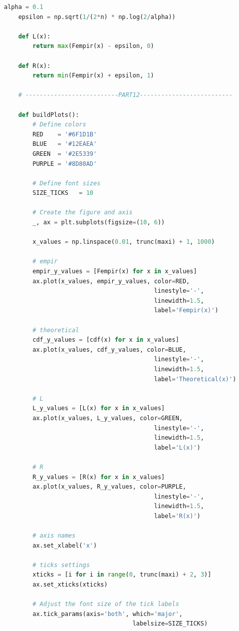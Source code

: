 \documentclass[a4paper, 14pt]{extarticle}
\begin{document}
\begin{center}
\begin{lstlisting}[language=Python]
    alpha = 0.1
    epsilon = np.sqrt(1/(2*n) * np.log(2/alpha))

    def L(x):
        return max(Fempir(x) - epsilon, 0)
    
    def R(x):
        return min(Fempir(x) + epsilon, 1)
    
    # --------------------------PART12--------------------------

    def buildPlots():
        # Define colors
        RED    = '#6F1D1B'
        BLUE   = '#12EAEA'
        GREEN  = '#2E5339'
        PURPLE = '#8D80AD'

        # Define font sizes
        SIZE_TICKS   = 10

        # Create the figure and axis
        _, ax = plt.subplots(figsize=(10, 6))

        x_values = np.linspace(0.01, trunc(maxi) + 1, 1000)

        # empir
        empir_y_values = [Fempir(x) for x in x_values]
        ax.plot(x_values, empir_y_values, color=RED, 
                                          linestyle='-', 
                                          linewidth=1.5, 
                                          label='Fempir(x)')

        # theoretical
        cdf_y_values = [cdf(x) for x in x_values]
        ax.plot(x_values, cdf_y_values, color=BLUE, 
                                          linestyle='-', 
                                          linewidth=1.5, 
                                          label='Theoretical(x)')

        # L
        L_y_values = [L(x) for x in x_values]
        ax.plot(x_values, L_y_values, color=GREEN, 
                                          linestyle='-', 
                                          linewidth=1.5, 
                                          label='L(x)')

        # R
        R_y_values = [R(x) for x in x_values]
        ax.plot(x_values, R_y_values, color=PURPLE, 
                                          linestyle='-', 
                                          linewidth=1.5, 
                                          label='R(x)')

        # axis names
        ax.set_xlabel('x')

        # ticks settings
        xticks = [i for i in range(0, trunc(maxi) + 2, 3)]
        ax.set_xticks(xticks)

        # Adjust the font size of the tick labels
        ax.tick_params(axis='both', which='major', 
                                    labelsize=SIZE_TICKS)


\end{lstlisting}
\end{center}
\end{document}
